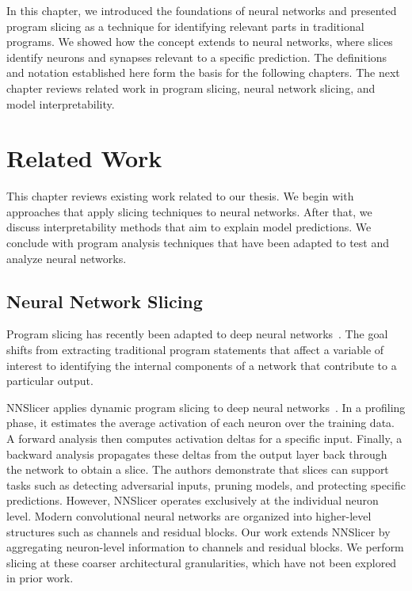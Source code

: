 \documentclass[
12pt,
fancyheadings,
a4paper,
twoside,
BCOR=0.7cm,
nobcorignoretitle,
grayscalebody,
]{stsreprt}
\begin{document}
\medskip

In this chapter, we introduced the foundations of neural networks and presented program slicing as
a technique for identifying relevant parts in traditional programs.
We showed how the concept extends to neural networks, where slices identify neurons and synapses
relevant to a specific prediction.
The definitions and notation established here form the basis for the following chapters.
The next chapter reviews related work in program slicing, neural network slicing, and model
interpretability.


\chapter{Related Work}
\label{ch:related-work}

This chapter reviews existing work related to our thesis.
We begin with approaches that apply slicing techniques to neural networks.
After that, we discuss interpretability methods that aim to explain model predictions.
We conclude with program analysis techniques that have been adapted to test and analyze neural
networks.

\section{Neural Network Slicing}
\label{sec:rw-slicing}

Program slicing has recently been adapted to deep neural
networks~\cite{zhang2020dynamic,wang2018interpret,qiu2019adversarial,zhou2024neusemslice}.
The goal shifts from extracting traditional program statements that affect a variable of interest
to identifying the internal components of a network that contribute to a particular output.

NNSlicer applies dynamic program slicing to deep neural networks~\cite{zhang2020dynamic}.
In a profiling phase, it estimates the average activation of each neuron over the training data.
A forward analysis then computes activation deltas for a specific input.
Finally, a backward analysis propagates these deltas from the output layer back through the network
to obtain a slice.
The authors demonstrate that slices can support tasks such as detecting adversarial inputs, pruning
models, and protecting specific predictions.
However, NNSlicer operates exclusively at the individual neuron level.
Modern convolutional neural networks are organized into higher-level structures such as channels
and residual blocks.
Our work extends NNSlicer by aggregating neuron-level information to channels and residual blocks.
We perform slicing at these coarser architectural granularities, which have not been explored in
prior work.
\end{document}
